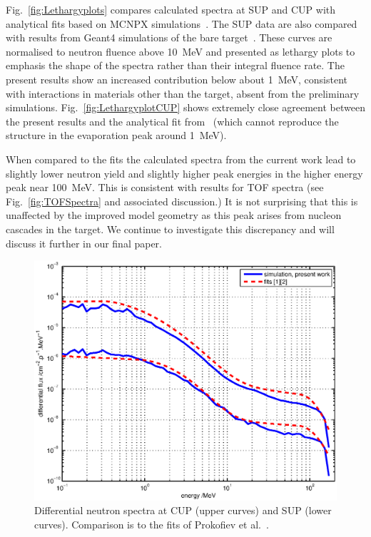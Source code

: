 \documentclass[peerreviewca,11pt,a4paper]{IEEEtran}
\let\MYoriglatexcaption\caption
\renewcommand{\caption}[2][\relax]{\MYoriglatexcaption[#2]{#2}}
\begin{document}
Fig.~\ref{fig:Lethargyplots} compares calculated spectra at SUP and CUP with analytical fits based on MCNPX simulations~\cite{Prokofiev2009,Prokofiev2014}.
The SUP data are also compared with results from Geant4 simulations of the bare target~\cite{Platt2013}.
These curves are normalised to neutron fluence above \SI{10}{\MeV} and presented as lethargy plots to emphasis the shape of the spectra rather than their integral fluence rate.
The present results show an increased contribution below about \SI{1}{\MeV}, consistent with interactions in materials other than the target, absent from the preliminary simulations.
Fig.~\ref{fig:LethargyplotCUP} shows extremely close agreement between the present results and the analytical fit from~\cite{Prokofiev2014} (which cannot reproduce the structure in the evaporation peak around \SI{1}{\MeV}).

When compared to the fits the calculated spectra from the current work lead to slightly lower neutron yield and slightly higher peak energies in the higher energy peak near \SI{100}{\MeV}.
This is consistent with results for TOF spectra (see Fig.~\ref{fig:TOFSpectra} and associated discussion.)
It is not surprising that this is unaffected by the improved model geometry as this peak arises from nucleon cascades in the target.
We continue to investigate this discrepancy and will discuss it further in our final paper.

\begin{figure}[!t]
    \centering
    \includegraphics[width=0.9\columnwidth]{DiffYieldComparedSUPCUP10RADECS.eps}
    \caption{
        Differential neutron spectra at CUP (upper curves) and SUP (lower curves).
        Comparison is to the fits of Prokofiev et al.~\cite{Prokofiev2009,Prokofiev2014}.
    }
    \label{fig:DifferentialSpectra}
\end{figure}
\end{document}
